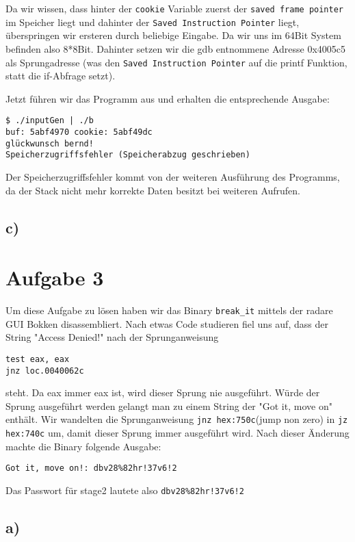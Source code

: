 \documentclass[10pt,a4paper]{article}
\begin{document}
Da wir wissen, dass hinter der \texttt{cookie} Variable zuerst der \texttt{saved frame pointer} im Speicher liegt und dahinter der \texttt{Saved Instruction Pointer} liegt, überspringen wir ersteren durch beliebige Eingabe. Da wir uns im 64Bit System befinden also 8*8Bit. Dahinter setzen wir die gdb entnommene Adresse 0x4005c5 als Sprungadresse (was den \texttt{Saved Instruction Pointer} auf die printf Funktion, statt die if-Abfrage setzt).

Jetzt führen wir das Programm aus und erhalten die entsprechende Ausgabe:
\begin{verbatim}
$ ./inputGen | ./b
buf: 5abf4970 cookie: 5abf49dc
glückwunsch bernd!
Speicherzugriffsfehler (Speicherabzug geschrieben)
\end{verbatim}

Der Speicherzugriffsfehler kommt von der weiteren Ausführung des Programms, da der Stack nicht mehr korrekte Daten besitzt bei weiteren Aufrufen.

\subsection*{c)}



\section*{Aufgabe 3}
Um diese Aufgabe zu lösen haben wir das Binary \texttt{break\_it} mittels der radare GUI Bokken disassembliert. Nach etwas Code studieren fiel uns auf, dass der String "Access Denied!" nach der Sprunganweisung 
\begin{verbatim}
test eax, eax
jnz loc.0040062c
\end{verbatim}  
steht. Da eax immer eax ist, wird dieser Sprung nie ausgeführt. Würde der Sprung ausgeführt werden gelangt man zu einem String der "Got it, move on" enthält. Wir wandelten die Sprunganweisung \texttt{jnz hex:750c}(jump non zero) in \texttt{jz hex:740c} um, damit dieser Sprung immer ausgeführt wird.
Nach dieser Änderung machte die Binary folgende Ausgabe:
\begin{verbatim}
Got it, move on!: dbv28%82hr!37v6!2
\end{verbatim}
Das Passwort für stage2 lautete also \texttt{dbv28\%82hr!37v6!2}

\subsection*{a)}
\end{document}
